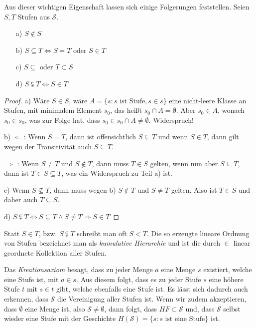 \documentclass[german]{article}
\theoremstyle{break}
\theoremstyle{def_style}
\theoremstyle{def_style}
\theoremstyle{lemma_style}
\begin{document}
Aus dieser wichtigen Eigenschaft lassen sich einige Folgerungen feststellen. Seien $S, T$ Stufen aus $\mathcal{S}$.
\begin{enumerate}
	\item[a)] $S\notin S$
	\item[b)] $S\subseteq T \Leftrightarrow S=T \text{ oder } S \in T$
	\item[c)] $S\subseteq \text{ oder } T\subset S$
	\item[d)] $S\subsetneqq T \Leftrightarrow S\in T$
\end{enumerate}
\begin{proof}
	a) Wäre $S\in S$, wäre $A=\{s : s \text{ ist Stufe}, s\in s\}$ eine nicht-leere Klasse an Stufen, mit minimalem Element $s_0$, das heißt $s_0\cap A=\emptyset$. 
	Aber $s_0\in A$, wonach $s_0\in s_0$, was zur Folge hat, dass $s_0\in s_0\cap A\neq \emptyset$. Widerspruch!
	
	b) \glqq$\Leftarrow$\grqq: Wenn $S=T$, dann ist offensichtlich $S\subseteq T$ und wenn $S\in T$, dann gilt wegen der Transitivität auch $S\subseteq T$.
	
	\glqq $\Rightarrow$ \grqq: Wenn $S\neq T$ und $S\notin T$, dann muss $T\in S$ gelten, wenn nun aber $S\subseteq T$, dann ist $T\in S\subseteq T$, was ein Widerspruch zu Teil a) ist.
	
	c) Wenn $S\not\subseteq T$, dann muss wegen b) $S\notin T$ und $S\neq T$ gelten. Also ist $T\in S$ und daher auch $T\subseteq S$.
	
	d) $S\subsetneqq T \Leftrightarrow S\subseteq T \land S\neq T \Rightarrow S\in T$
\end{proof}

Statt $S\in T$, bzw. $S\subsetneqq T$ schreibt man oft $S<T$. Die so erzeugte lineare Ordnung von Stufen bezeichnet man als \textit{kumulative Hierarchie} und ist die durch $\in$ linear geordnete Kollektion aller Stufen.

Das \textit{Kreationsaxiom} besagt, dass zu jeder Menge $a$ eine Menge $s$ existiert, welche eine Stufe ist, mit $a\in s$. Aus diesem folgt, dass es zu jeder Stufe $s$ eine höhere Stufe $t$ mit $s\in t$ gibt, welche ebenfalls eine Stufe ist. Es lässt sich dadurch auch erkennen, dass $\mathcal{S}$ die Vereinigung aller Stufen ist. Wenn wir zudem akzeptieren, dass $\emptyset$ eine Menge ist, also $\mathcal{S}\neq \emptyset$, dann folgt, dass $HF\subset \mathcal{S}$ und, dass $\mathcal{S}$ selbst wieder eine Stufe mit der Geschichte $H(\mathcal{S})=\{s: s\text{ ist eine Stufe}\}$ ist.
\end{document}
